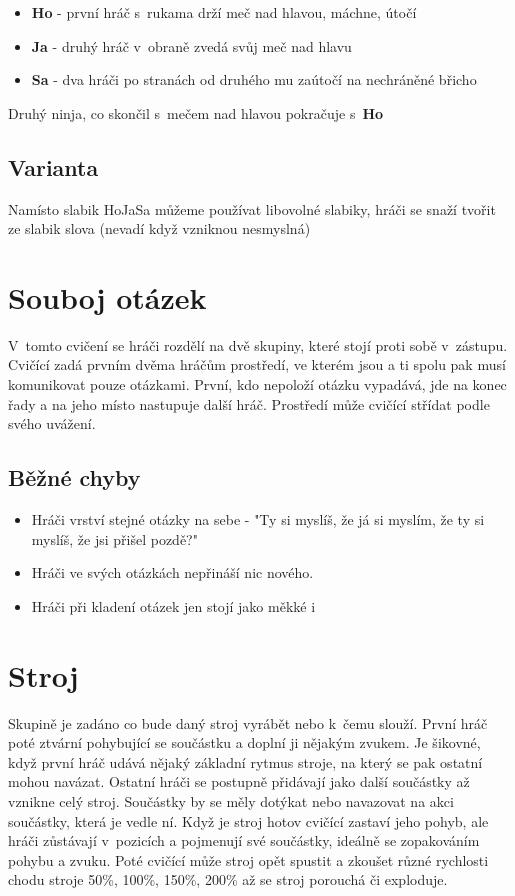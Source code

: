 \begin{itemize}
\item  \textbf{Ho} - první hráč s~rukama drží meč nad hlavou, máchne, útočí
\item  \textbf{Ja} - druhý hráč v~obraně zvedá svůj meč nad hlavu
\item  \textbf{Sa} - dva hráči po stranách od druhého mu zaútočí na nechráněné břicho
\end{itemize}
Druhý ninja, co skončil s~mečem nad hlavou pokračuje s~\textbf{Ho} 
 
\subsection{ Varianta } Namísto slabik HoJaSa můžeme používat libovolné slabiky, hráči se snaží tvořit ze slabik slova (nevadí když vzniknou nesmyslná) 
 
 
 
 
\needspace{5cm} \section{Souboj otázek} \label{souboj otázek} V~tomto cvičení se hráči rozdělí na dvě skupiny, které stojí proti sobě v~zástupu. Cvičící zadá prvním dvěma hráčům prostředí, ve kterém jsou a ti spolu pak musí komunikovat pouze otázkami. První, kdo nepoloží otázku vypadává, jde na konec řady a na jeho místo nastupuje další hráč. Prostředí může cvičící střídat podle svého uvážení. 
 
\subsection{ Běžné chyby } \begin{itemize}
\item Hráči vrství stejné otázky na sebe - "Ty si myslíš, že já si myslím, že ty si myslíš, že jsi přišel pozdě?"
\item Hráči ve svých otázkách nepřináší nic nového.
\item Hráči při kladení otázek jen stojí jako měkké i
\end{itemize}
 
  
 
 
 
\needspace{5cm} \section{Stroj} \label{stroj} Skupině je zadáno co bude daný stroj vyrábět nebo k~čemu slouží. První hráč poté ztvární pohybující se součástku a doplní ji nějakým zvukem. Je šikovné, když první hráč udává nějaký základní rytmus stroje, na který se pak ostatní mohou navázat. Ostatní hráči se postupně přidávají jako další součástky až vznikne celý stroj. Součástky by se měly dotýkat nebo navazovat na akci součástky, která je vedle ní. Když je stroj hotov cvičící zastaví jeho pohyb, ale hráči zůstávají v~pozicích a pojmenují své součástky, ideálně se zopakováním pohybu a zvuku. Poté cvičící může stroj opět spustit a zkoušet různé rychlosti chodu stroje 50\%{}, 100\%{}, 150\%{}, 200\%{} až se stroj porouchá či exploduje. 
 
